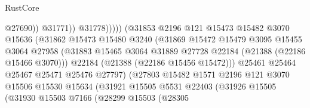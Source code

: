 \begin{lexlean}{RustCore}
\begin{coremodule}
                                                  @27690))
                                              @31771))
                                          @31778)))))
                                (@31853
                                  @2196
                                  @121
                                  @15473
                                  @15482
                                  @3070
                                  @15636
                                  (@31862
                                    @15473
                                    @15480
                                    @3240
                                    (@31869
                                      @15472
                                      @15479
                                      @3095
                                      @15455
                                      @3064
                                      @27958
                                      (@31883
                                        @15465
                                        @3064
                                        @31889
                                        @27728
                                        @22184
                                        (@21388 (@22186 @15466 @3070)))
                                      @22184
                                      (@21388 (@22186 @15456 @15472)))
                                    @25461
                                    @25464
                                    @25467
                                    @25471
                                    @25476
                                    @27797)
                                  (@27803
                                    @15482
                                    @1571
                                    @2196
                                    @121
                                    @3070
                                    @15506
                                    @15530
                                    @15634
                                    (@31921
                                      @15505
                                      @5531
                                      @22403
                                      (@31926
                                        @15505
                                        (@31930
                                          @15503
                                          @7166
                                          (@28299
                                            @15503
                                            (@28305

\end{coremodule}
\end{lexlean}
